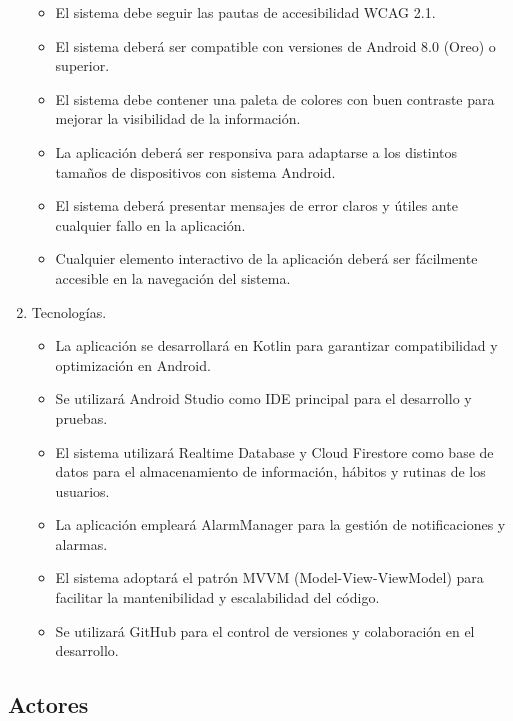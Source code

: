 \documentclass[letterpaper,12pt,oneside]{article}
\begin{document}
\begin{enumerate}
                    \begin{itemize}
                        \item El sistema debe seguir las pautas de accesibilidad WCAG 2.1.
                        \item El sistema deberá ser compatible con versiones de Android 8.0 (Oreo) o superior.
                        \item El sistema debe contener una paleta de colores con buen contraste para mejorar la visibilidad de la información.
                        \item La aplicación deberá ser responsiva para adaptarse a los distintos tamaños de dispositivos con sistema Android.
                        \item El sistema deberá presentar mensajes de error claros y útiles ante cualquier fallo en la aplicación.
                        \item Cualquier elemento interactivo de la aplicación deberá ser fácilmente accesible en la navegación del sistema.
                        \newline
                    \end{itemize}
                \item Tecnologías.
                    \begin{itemize}
                        \item La aplicación se desarrollará en Kotlin para garantizar compatibilidad y optimización en Android.
                        \item Se utilizará Android Studio como IDE principal para el desarrollo y pruebas.
                        \item El sistema utilizará Realtime  Database y Cloud Firestore como base de datos para el almacenamiento de información, hábitos y rutinas de los usuarios.
                        \item La aplicación empleará AlarmManager para la gestión de notificaciones y alarmas.
                        \item El sistema adoptará el patrón MVVM (Model-View-ViewModel) para facilitar la mantenibilidad y escalabilidad del código.
                        \item Se utilizará GitHub para el control de versiones y colaboración en el desarrollo.
                    \end{itemize}
            \end{enumerate}
        \subsection{Actores}
\end{document}
